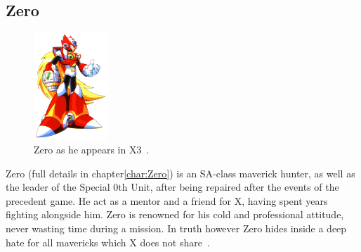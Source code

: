 \subsection{Zero}
\begin{figure}[htp]
	\centering
	\includegraphics[height=4cm]{figures/X3/Zero.png}
	\caption{Zero as he appears in X3~\cite{book:MMX_Complete_art}.}
\end{figure}
Zero (full details in chapter\ref{char:Zero}) is an SA-class maverick hunter, as well as the leader of the Special 0th Unit, after being repaired after the events of the precedent game. He act as a mentor and a friend for X, having spent years fighting alongside him. Zero is renowned for his cold and professional attitude, never wasting time during a mission. In truth however Zero hides inside a deep hate for all mavericks which X does not share~\cite{Xcoll1:Manual_X3}.

